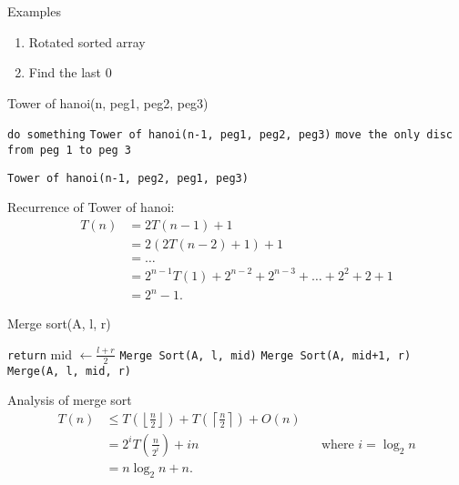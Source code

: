 \documentclass[../../main/main.tex]{subfiles}
\begin{document}
Examples
\begin{enumerate}
	\item Rotated sorted array
	\item Find the last 0
\end{enumerate}

\begin{algorithm}[H]
	\caption{Tower of hanoi(n, peg1, peg2, peg3)}
	\begin{algorithmic}[1]
		\texttt{do something}
		\Else
		\State \texttt{Tower of hanoi(n-1, peg1, peg2, peg3)} 
		\State \texttt{move the only disc from peg 1 to peg 3} 

		\State\texttt{Tower of hanoi(n-1, peg2, peg1, peg3)} 
		\EndIf
	\end{algorithmic}
\end{algorithm}

\begin{theorem}
	Recurrence of Tower of hanoi:
	\begin{align*}
		T(n) & = 2T(n-1) + 1                                              \\
		     & = 2(2T(n-2) + 1) + 1                                       \\
		     & = \ldots                                                   \\
		     & = 2^{n-1}T(1) +  2^{n-2} + 2^{n-3}  + \ldots + 2^2 + 2 + 1 \\
		     & = 2^{n} - 1
		.\end{align*}

\end{theorem}
\begin{algorithm}[H]
	\caption{Merge sort(A, l, r)}
	\begin{algorithmic}[1]
		\texttt{return}
		\Else
		\State mid $\gets \frac{l+r}{2}$
		\State \texttt{Merge Sort(A, l, mid)} 
		\State \texttt{Merge Sort(A, mid+1, r)} 
		\State \texttt{Merge(A, l, mid, r)} 
		\EndIf
	\end{algorithmic}
\end{algorithm}
\begin{theorem}
	Analysis of merge sort
	\begin{align*}
		T(n) & \le  T(\left\lfloor \frac{n}{2} \right\rfloor) + T(\left\lceil \frac{n}{2} \right\rceil ) + O(n)                                 \\
		     & = 2^{i}T(\frac{n}{2^{i}}) + in                                                                   &  & \text{where $i = \log_2n$} \\
		     & = n\log_2n + n
		.\end{align*}
\end{theorem}
\end{document}
